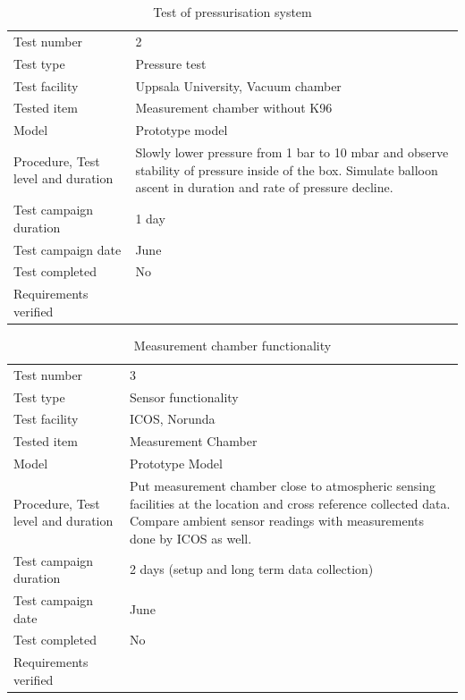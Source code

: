 \documentclass[
  a4paper,
  11pt,
  openany,
  parskip,
  toc=totoc,
  listof=totoc,
  bibliography=totoc
]{scrreprt}
\begin{document}
\begin{table}[H]
\centering
\caption{Test of pressurisation system}
\label{tab:test_pressurisation_system}
\begin{tabular}{L{5cm}L{10cm}}
\toprule
Test number & 2 \\
Test type & Pressure test \\
Test facility & Uppsala University, Vacuum chamber \\
Tested item & Measurement chamber without K96\\
Model & Prototype model \\
Procedure, Test level and duration & Slowly lower pressure from 1 bar to 10 mbar and observe stability of pressure inside of the box. Simulate balloon ascent in duration and rate of pressure decline.  \\
Test campaign duration & 1 day \\
Test campaign date & June \\
Test completed & No \\
Requirements verified & \\
\bottomrule
\end{tabular}
\end{table}


\begin{table}[H]
\centering
\caption{Measurement chamber functionality}
\label{tab:test3}
\begin{tabular}{L{5cm}L{10cm}}
\toprule
Test number & 3 \\
Test type & Sensor functionality \\
Test facility & ICOS, Norunda \\
Tested item & Measurement Chamber \\
Model & Prototype Model \\
Procedure, Test level and duration & Put measurement chamber close to atmospheric sensing facilities at the location and cross reference collected data. Compare ambient sensor readings with measurements done by ICOS as well. \\
Test campaign duration & 2 days (setup and long term data collection) \\
Test campaign date & June \\
Test completed & No \\
Requirements verified & \\
\bottomrule
\end{tabular}
\end{table}
\end{document}
